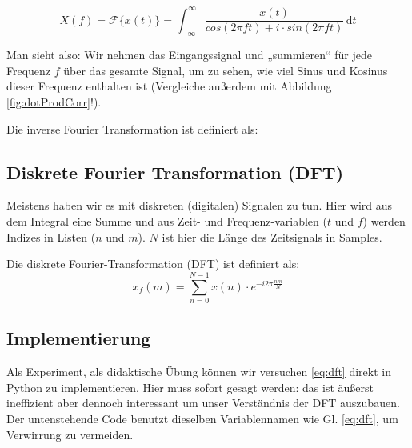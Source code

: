 \begin{equation}
	X(f)= \mathcal{F} \{x(t)\} = \int_{-\infty}^\infty \! \frac{x(t)} { cos(2\pi ft)+i \cdot sin(2\pi ft) }  \, \mathrm{d}t
	\label{ft3}
\end{equation}

Man sieht also: Wir nehmen das Eingangssignal und „summieren“ für jede Frequenz $f$ über das gesamte Signal, um zu sehen, wie viel Sinus und Kosinus dieser Frequenz enthalten ist (Vergleiche außerdem mit Abbildung \ref{fig:dotProdCorr}!). 


Die inverse Fourier Transformation ist definiert als:


\subsection*{Diskrete Fourier Transformation (DFT)}
Meistens haben wir es mit diskreten (digitalen) Signalen zu tun. Hier wird aus dem Integral eine Summe und aus Zeit- und Frequenz-variablen ($t$ und $f$) werden Indizes in Listen ($n$ und $m$). $N$ ist hier die Länge des Zeitsignals in Samples.




Die diskrete Fourier-Transformation (DFT) ist definiert als:
\begin{equation}
	x_f(m) = \sum_{n=0}^{N-1} x(n)\cdot e^{-i 2 \pi \frac{n m}{N} }
	\label{eq:dft}
\end{equation}

\subsection{Implementierung}
Als Experiment, als didaktische Übung können wir versuchen \ref{eq:dft} direkt in Python zu implementieren. Hier muss sofort gesagt werden: das ist äußerst ineffizient aber dennoch interessant um unser Verständnis der DFT auszubauen.
Der untenstehende Code benutzt dieselben Variablennamen wie Gl. \ref{eq:dft}, um Verwirrung zu vermeiden.

